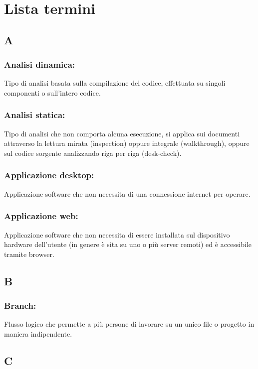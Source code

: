 \newpage
{}
\section*{Lista termini}

\subsection*{\huge{A}}

\subsubsection*{Analisi dinamica:}
Tipo di analisi basata sulla compilazione del codice, effettuata su singoli
componenti o sull'intero codice.

\subsubsection*{Analisi statica:}
Tipo di analisi che non comporta alcuna esecuzione, si applica sui
documenti attraverso la lettura mirata (inspection) oppure integrale
(walkthrough), oppure sul codice sorgente analizzando riga per riga (desk-check).

\subsubsection*{Applicazione desktop:}
Applicazione software che non necessita di una connessione internet per operare.

\subsubsection*{Applicazione web:}
Applicazione software che non necessita di essere installata sul dispositivo
hardware dell'utente (in genere \`e sita su uno o pi\`u server remoti) ed \`e accessibile tramite browser.

\subsection*{\huge{B}}

\subsubsection*{Branch:} 
Flusso logico che permette a pi\`u persone di lavorare su un unico file o
progetto in maniera indipendente.

\subsection*{\huge{C}}

